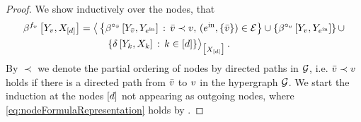 \begin{proof}
    We show inductively over the nodes, that
    \begin{align}
        \label{eq:nodeFormulaRepresentation}
        \bencodingofat{\formulaof{\node}}{\headvariableof{\node},\shortcatvariables}
        = \breakablecontractionof{
            &\left\{
                 \bencodingofat{\connectiveof{\thirdnode}}{\headvariableof{\thirdnode},\headvariableof{\incomingnodes}} \wcols \thirdnode\prec\node \ncond (\incomingnodes,\{\thirdnode\})\in\edges
            \right\} \cup \left\{\bencodingofat{\connectiveof{\node}}{\headvariableof{\node},\headvariableof{\incomingnodes}}\right\}  \cup \\
            & \quad \{\identityat{\headvariableof{\atomenumerator},\catvariableof{\atomenumerator}} \wcols \atomenumeratorin\}
        }{\shortcatvariables} \, .
    \end{align}
    By $\prec$ we denote the partial ordering of nodes by directed paths in $\mathcal{G}$, i.e. $\bar{v} \prec v$ holds if there is a directed path from $\bar{v}$ to $v$ in the hypergraph $\mathcal{G}$.
    We start the induction at the nodes $[d]$ not appearing as outgoing nodes, where \eqref{eq:nodeFormulaRepresentation} holds by .


\end{proof}
